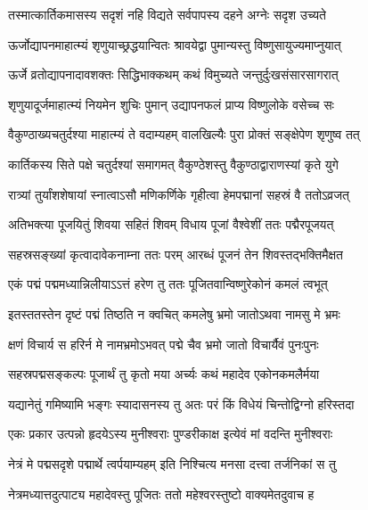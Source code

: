 \twolineshloka
{तस्मात्कार्तिकमासस्य सदृशं नहि विद्यते}
{सर्वपापस्य दहने अग्नेः सदृश उच्यते} %

\twolineshloka
{ऊर्जोद्यापनमाहात्म्यं शृणुयाच्छ्रद्धयान्वितः}
{श्रावयेद्वा पुमान्यस्तु विष्णुसायुज्यमाप्नुयात्} %


\twolineshloka
{ऊर्जे व्रतोद्यापनादावशक्तः सिद्धिभाक्कथम्}
{कथं विमुच्यते जन्तुर्दुःखसंसारसागरात्} %


\twolineshloka
{शृणुयादूर्जमाहात्म्यं नियमेन शुचिः पुमान्}
{उद्यापनफलं प्राप्य विष्णुलोके वसेच्च सः} %





\twolineshloka
{वैकुण्ठाख्यचतुर्दश्या माहात्म्यं ते वदाम्यहम्}
{वालखिल्यैः पुरा प्रोक्तं सङ्क्षेपेण शृणुष्व तत्} %


\twolineshloka
{कार्तिकस्य सिते पक्षे चतुर्दश्यां समागमत्}
{वैकुण्ठेशस्तु वैकुण्ठाद्वाराणस्यां कृते युगे} %

\twolineshloka
{रात्र्यां तुर्यांशशेषायां स्नात्वाऽसौ मणिकर्णिके}
{गृहीत्वा हेमपद्मानां सहस्रं वै ततोऽव्रजत्} %

\twolineshloka
{अतिभक्त्या पूजयितुं शिवया सहितं शिवम्}
{विधाय पूजां वैश्वेशीं ततः पद्मैरपूजयत्} %

\twolineshloka
{सहस्रसङ्ख्यां कृत्वादावेकनाम्ना ततः परम्}
{आरब्धं पूजनं तेन शिवस्तद्भक्तिमैक्षत} %

\twolineshloka
{एकं पद्मं पद्ममध्यान्निलीयाऽऽत्तं हरेण तु}
{ततः पूजितवान्विष्णुरेकोनं कमलं त्वभूत्} %

\twolineshloka
{इतस्ततस्तेन दृष्टं पद्मं तिष्ठति न क्वचित्}
{कमलेषु भ्रमो जातोऽथवा नामसु मे भ्रमः} %

\twolineshloka
{क्षणं विचार्य स हरिर्न मे नामभ्रमोऽभवत्}
{पद्मे चैव भ्रमो जातो विचार्यैवं पुनःपुनः} %

\twolineshloka
{सहस्रपद्मसङ्कल्पः पूजार्थं तु कृतो मया}
{अर्च्यः कथं महादेव एकोनकमलैर्मया} %

\twolineshloka
{यद्यानेतुं गमिष्यामि भङ्गः स्यादासनस्य तु}
{अतः परं किं विधेयं चिन्तोद्विग्नो हरिस्तदा} %

\twolineshloka
{एकः प्रकार उत्पन्नो हृदयेऽस्य मुनीश्वराः}
{पुण्डरीकाक्ष इत्येवं मां वदन्ति मुनीश्वराः} %

\twolineshloka
{नेत्रं मे पद्मसदृशे पद्मार्थे त्वर्पयाम्यहम्}
{इति निश्चित्य मनसा दत्त्वा तर्जनिकां स तु} %

\twolineshloka
{नेत्रमध्यात्तदुत्पाट्य महादेवस्तु पूजितः}
{ततो महेश्वरस्तुष्टो वाक्यमेतदुवाच ह} %


